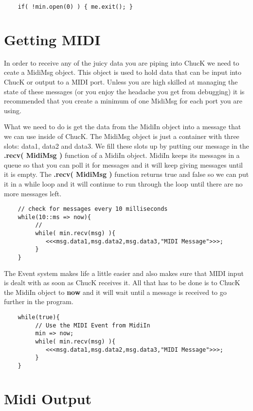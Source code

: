 \begin{verbatim}
    if( !min.open(0) ) { me.exit(); }
\end{verbatim}

\section*{Getting MIDI}

In order to receive any of the juicy data you are piping into ChucK we need to ceate a MidiMsg object. This object is used to hold data that can be input into ChucK or output to a MIDI port. Unless you are high skilled at managing the state of these messages (or you enjoy the headache you get from debugging) it is recommended that you create a minimum of one MidiMsg for each port you are using. 

What we need to do is get the data from the MidiIn object into a message that we can use inside of ChucK. The MidiMsg object is just a container with three slots: data1, data2 and data3. We fill these slots up by putting our message in the  {\bf .recv( MidiMsg )} function of a MidiIn object. MidiIn keeps its messages in a queue so that you can poll it for messages and it will keep giving messages until it is empty. The {\bf .recv( MidiMsg )} function returns true and false so we can put it in a while loop and it will continue to run through the loop until there are no more messages left.


\begin{verbatim}
    // check for messages every 10 milliseconds
    while(10::ms => now){
         //
         while( min.recv(msg) ){
            <<<msg.data1,msg.data2,msg.data3,"MIDI Message">>>;
         }
    }
\end{verbatim}

The Event system makes life a little easier and also makes sure that MIDI input is dealt with as soon as ChucK receives it. All that has to be done is to ChucK the MidiIn object to {\bf now} and it will wait until a message is received to go further in the program.

\begin{verbatim}
    while(true){
         // Use the MIDI Event from MidiIn
         min => now;
         while( min.recv(msg) ){
            <<<msg.data1,msg.data2,msg.data3,"MIDI Message">>>;
         }
    }
\end{verbatim}

\section*{Midi Output}

